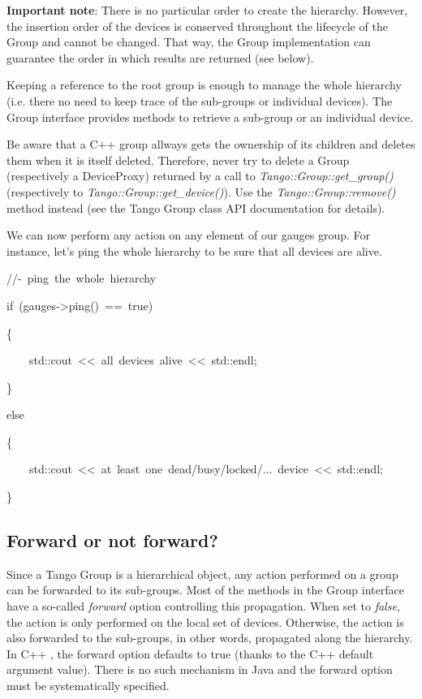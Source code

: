 \textbf{Important note}: There is no particular order to create the
hierarchy. However, the insertion order of the devices is conserved
throughout the lifecycle of the Group and cannot be changed. That
way, the Group implementation can guarantee the order in which results
are returned (see below). 

Keeping a reference to the root group is enough to manage
the whole hierarchy (i.e. there no need to keep trace of the sub-groups
or individual devices). The Group interface provides methods to retrieve
a sub-group or an individual device. 

Be aware that a C++ group allways gets the ownership of its children
and deletes them when it is itself deleted. Therefore, never try to
delete a Group (respectively a DeviceProxy) returned by a call to
\emph{Tango::Group::get\_group()} (respectively
to \emph{Tango::Group::get\_device()}). Use the
\emph{Tango::Group::remove()} method instead (see the
Tango Group class API documentation for details). 

We can now perform any action on any element of our \textquotedbl{}gauges\textquotedbl{}
group. For instance, let's ping the whole hierarchy to be sure that
all devices are alive.


\begin{lyxcode}
//-~ping~the~whole~hierarchy~

if~(gauges->ping()~==~true)

\{

~~~~std::cout~<\textcompwordmark{}<~\textquotedbl{}all~devices~alive\textquotedbl{}~<\textcompwordmark{}<~std::endl;

\}

else

\{

~~~~std::cout~<\textcompwordmark{}<~\textquotedbl{}at~least~one~dead/busy/locked/...~device\textquotedbl{}~<\textcompwordmark{}<~std::endl;

\}
\end{lyxcode}
 


\subsection{Forward or not forward?}

Since a Tango Group is a hierarchical object, any action performed
on a group can be forwarded to its sub-groups. Most of the methods
in the Group interface have a so-called \emph{forward} option controlling
this propagation. When set to \emph{false}, the action is only performed
on the local set of devices. Otherwise, the action is also forwarded
to the sub-groups, in other words, propagated along the hierarchy.
In C++ , the forward option defaults to true (thanks to the C++ default
argument value). There is no such mechanism in Java and the forward
option must be systematically specified.


